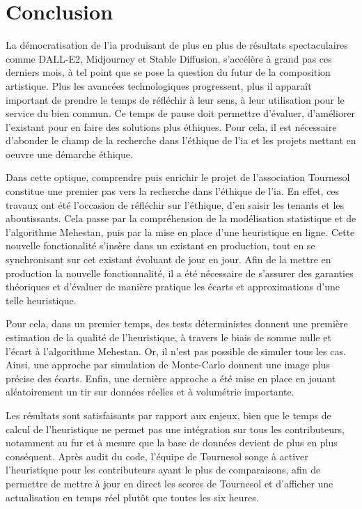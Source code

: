 \section{Conclusion}

La démocratisation de l'\gls{ia} produisant de plus en plus de résultats spectaculaires comme DALL-E2, Midjourney et Stable Diffusion, s'accélère à grand pas ces derniers mois, à tel point que se pose la question du futur de la composition artistique. Plus les avancées technologiques progressent, plus il apparaît important de prendre le temps de réfléchir à leur sens, à leur utilisation pour le service du bien commun. Ce temps de pause doit permettre d'évaluer, d'améliorer l'existant pour en faire des solutions plus éthiques. Pour cela, il est nécessaire d'abonder le champ de la recherche dans l'éthique de l'\gls{ia} et les projets mettant en oeuvre une démarche éthique.

Dans cette optique, comprendre puis enrichir le projet de l'association Tournesol constitue une premier pas vers la recherche dans l'éthique de l'\gls{ia}. En effet, ces travaux ont été l'occasion de réfléchir sur l'éthique, d'en saisir les tenants et les aboutissants. Cela passe par la compréhension de la modélisation statistique et de l'algorithme Mehestan, puis par la mise en place d'une heuristique en ligne. Cette nouvelle fonctionalité s'insère dans un existant en production, tout en se synchronisant sur cet existant évoluant de jour en jour. 
Afin de la mettre en production la nouvelle fonctionnalité, il a été nécessaire de s'assurer des garanties théoriques et d'évaluer de manière pratique les écarts et approximations d'une telle heuristique.

Pour cela, dans un premier temps, des tests déterministes donnent une première estimation de la qualité de l'heuristique, à travers le biais de somme nulle et l'écart à l'algorithme Mehestan. Or, il n'est pas possible de simuler tous les cas. Ainsi, une approche par simulation de Monte-Carlo donnent une image plus précise des écarts. Enfin, une dernière approche a été mise en place en jouant aléatoirement un tir sur données réelles et à volumétrie importante.

Les résultats sont satisfaisants par rapport aux enjeux, bien que le temps de calcul de l'heuristique ne permet pas une intégration sur tous les contributeurs, notamment au fur et à mesure que la base de données devient de plus en plus conséquent. Après audit du code, l'équipe de Tournesol songe à activer l'heuristique pour les contributeurs ayant le plus de comparaisons, afin de permettre de mettre à jour en direct les scores de Tournesol et d'afficher une actualisation en temps réel plutôt que toutes les six heures.
\pagebreak